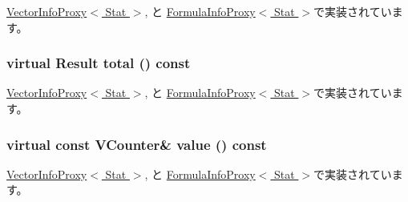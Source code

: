 \hyperlink{classStats_1_1VectorInfoProxy_a503ab01f6c0142145d3434f6924714e7}{VectorInfoProxy$<$ Stat $>$}, と \hyperlink{classStats_1_1FormulaInfoProxy_a503ab01f6c0142145d3434f6924714e7}{FormulaInfoProxy$<$ Stat $>$}で実装されています。\hypertarget{classStats_1_1VectorInfo_ab152b7e89b37a7db03b04d500ceb8349}{
\subsubsection[{total}]{\setlength{\rightskip}{0pt plus 5cm}virtual {\bf Result} total () const}}
\label{classStats_1_1VectorInfo_ab152b7e89b37a7db03b04d500ceb8349}


\hyperlink{classStats_1_1VectorInfoProxy_a35c6e2ed3fc81b40d69052a062113ead}{VectorInfoProxy$<$ Stat $>$}, と \hyperlink{classStats_1_1FormulaInfoProxy_a35c6e2ed3fc81b40d69052a062113ead}{FormulaInfoProxy$<$ Stat $>$}で実装されています。\hypertarget{classStats_1_1VectorInfo_a23b21bb9bfe7e45c824c7607a1c301fc}{
\subsubsection[{value}]{\setlength{\rightskip}{0pt plus 5cm}virtual const {\bf VCounter}\& value () const}}
\label{classStats_1_1VectorInfo_a23b21bb9bfe7e45c824c7607a1c301fc}


\hyperlink{classStats_1_1VectorInfoProxy_a1840628d1aea3c4fe5cf3ae375850a4a}{VectorInfoProxy$<$ Stat $>$}, と \hyperlink{classStats_1_1FormulaInfoProxy_a1840628d1aea3c4fe5cf3ae375850a4a}{FormulaInfoProxy$<$ Stat $>$}で実装されています。

